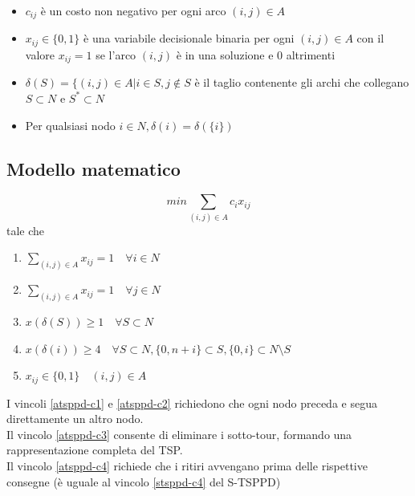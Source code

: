 \documentclass[9pt]{beamer}
\begin{document}
\begin{frame}[allowframebreaks]{\subsecname}
\begin{itemize}
		\item
		$c_{ij}$ è un costo non negativo per ogni arco $(i,j) \in A$

		\item
		$x_{ij} \in \{ 0, 1 \}$ è una variabile decisionale binaria per ogni $(i, j) \in A$ con il valore $x_{ij} = 1$ se l'arco $(i, j)$ è in una soluzione e $0$ altrimenti

		\item
		$\delta(S) = \{ (i, j) \in A | i \in S, j \notin S$ è il taglio contenente gli archi che collegano $S \subset N$ e $S^* \subset N$ 

		\item
		Per qualsiasi nodo $i \in N, \delta(i) = \delta( \{ i \})$
	\end{itemize}
\end{frame}

\subsection{Modello matematico}
\begin{frame}{\subsecname}

     	\[ min{ \sum_{(i,j) \in A} c_i x_{ij}} \]
	tale che
	\begin{enumerate}
		\item
		\label{atsppd-c1}
		$\sum_{(i,j) \in A} x_{ij} = 1 \quad \forall i \in N$

		\item
		\label{atsppd-c2}
		$\sum_{(i,j) \in A} x_{ij} = 1 \quad \forall j \in N$

		\item
		\label{atsppd-c3}
		$x(\delta(S)) \geq 1 \quad \forall S \subset N$
	
		\item
		\label{atsppd-c4}
		$x(\delta(i)) \geq 4 \quad \forall S \subset N, \{0, n+i\} \subset S, \{0,i\} \subset N \setminus S$

		\item
		$x_{ij} \in \{0,1\} \quad (i,j) \in A$
	\end{enumerate}
	
	\footnotesize
	I vincoli \ref{atsppd-c1} e \ref{atsppd-c2} richiedono che ogni nodo preceda e segua direttamente un altro nodo. \\
	Il vincolo \ref{atsppd-c3} consente di eliminare i sotto-tour, formando una rappresentazione completa del TSP. \\
	Il vincolo \ref{atsppd-c4} richiede che i ritiri avvengano prima delle rispettive consegne (è uguale al vincolo \ref{stsppd-c4} del S-TSPPD)

\end{frame}
\end{document}
